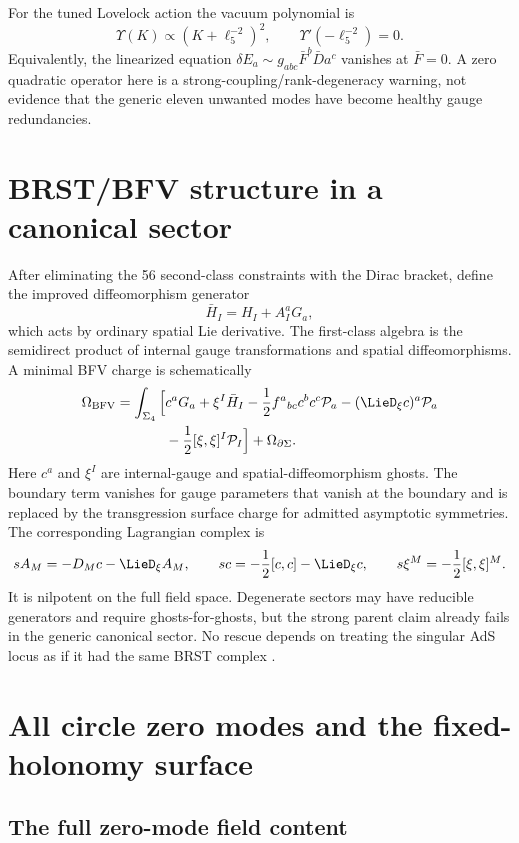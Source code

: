 For the tuned Lovelock action the vacuum polynomial is
\[
\Upsilon(K)\propto(K+\ell_5^{-2})^2,
\qquad
\Upsilon'(-\ell_5^{-2})=0.
\]
Equivalently, the linearized equation $\delta E_a\sim g_{abc}\bar F^b\bar D a^c$ vanishes at $\bar F=0$.  A zero quadratic operator here is a strong-coupling/rank-degeneracy warning, not evidence that the generic eleven unwanted modes have become healthy gauge redundancies.

\section{BRST/BFV structure in a canonical sector}
\label{sec:brst}

After eliminating the 56 second-class constraints with the Dirac bracket, define the improved diffeomorphism generator
\[
\bar H_I=H_I+A_I^aG_a,
\]
which acts by ordinary spatial Lie derivative.  The first-class algebra is the semidirect product of internal gauge transformations and spatial diffeomorphisms.  A minimal BFV charge is schematically
\[
\begin{aligned}
\Omega_{\rm BFV}=\int_{\Sigma_4}\Big[&c^aG_a+\xi^I\bar H_I
-\frac12f^a{}_{bc}c^bc^c\mathcal P_a
-(\LieD_\xi c)^a\mathcal P_a\\
&-\frac12[\xi,\xi]^I\mathcal P_I\Big]
+\Omega_{\partial\Sigma}.
\end{aligned}
\]
Here $c^a$ and $\xi^I$ are internal-gauge and spatial-diffeomorphism ghosts.  The boundary term vanishes for gauge parameters that vanish at the boundary and is replaced by the transgression surface charge for admitted asymptotic symmetries.  The corresponding Lagrangian complex is
\[
sA_M=-D_Mc-\LieD_\xi A_M,
\qquad
sc=-\frac12[c,c]-\LieD_\xi c,
\qquad
s\xi^M=-\frac12[\xi,\xi]^M.
\]
It is nilpotent on the full field space.  Degenerate sectors may have reducible generators and require ghosts-for-ghosts, but the strong parent claim already fails in the generic canonical sector.  No rescue depends on treating the singular AdS locus as if it had the same BRST complex \citep{HenneauxTeitelboim1992,MiskovicTroncosoZanelli2005}.

\section{All circle zero modes and the fixed-holonomy surface}
\label{sec:zeromodes}

\subsection{The full zero-mode field content}

